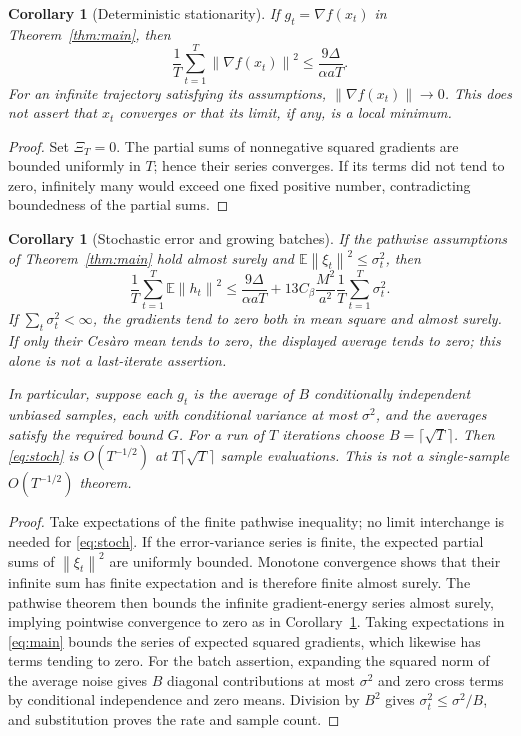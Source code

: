 \documentclass[11pt]{article}
\newtheorem{corollary}[theorem]{Corollary}
\theoremstyle{definition}
\theoremstyle{remark}
\newcommand{\E}{\mathbb E}
\newcommand{\norm}[1]{\left\lVert#1\right\rVert}
\begin{document}
\begin{corollary}[Deterministic stationarity]\label{cor:det}
If $g_t=\nabla f(x_t)$ in Theorem~\ref{thm:main}, then
\[
 \frac1T\sum_{t=1}^T\norm{\nabla f(x_t)}^2\le\frac{9\Delta}{\alpha aT}.
\]
For an infinite trajectory satisfying its assumptions, $\norm{\nabla f(x_t)}\to0$.
This does not assert that $x_t$ converges or that its limit, if any, is a
local minimum.
\end{corollary}
\begin{proof}
Set $\Xi_T=0$. The partial sums of nonnegative squared gradients are bounded
uniformly in $T$; hence their series converges. If its terms did not tend to
zero, infinitely many would exceed one fixed positive number, contradicting
boundedness of the partial sums.
\end{proof}

\begin{corollary}[Stochastic error and growing batches]\label{cor:noise}
If the pathwise assumptions of Theorem~\ref{thm:main} hold almost surely and
$\E\norm{\xi_t}^2\le\sigma_t^2$, then
\begin{equation}\label{eq:stoch}
 \frac1T\sum_{t=1}^T\E\norm{h_t}^2
 \le\frac{9\Delta}{\alpha aT}
 +13C_\beta\frac{M^2}{a^2}\frac1T\sum_{t=1}^T\sigma_t^2.
\end{equation}
If $\sum_t\sigma_t^2<\infty$, the gradients tend to zero both in mean square
and almost surely. If only their Ces\`aro mean tends to zero, the displayed
average tends to zero; this alone is not a last-iterate assertion.

In particular, suppose each $g_t$ is the average of $B$ conditionally
independent unbiased samples, each with conditional variance at most
$\sigma^2$, and the averages satisfy the required bound $G$. For a run of
$T$ iterations choose $B=\lceil\sqrt T\rceil$. Then \eqref{eq:stoch} is
$O(T^{-1/2})$ at $T\lceil\sqrt T\rceil$ sample evaluations. This is not a
single-sample $O(T^{-1/2})$ theorem.
\end{corollary}
\begin{proof}
Take expectations of the finite pathwise inequality; no limit interchange is
needed for \eqref{eq:stoch}. If the error-variance series is finite, the expected
partial sums of $\norm{\xi_t}^2$ are uniformly bounded. Monotone convergence
shows that their infinite sum has finite expectation and is therefore finite
almost surely. The pathwise theorem then bounds the infinite gradient-energy
series almost surely, implying pointwise convergence to zero as in
Corollary~\ref{cor:det}. Taking expectations in \eqref{eq:main} bounds the
series of expected squared gradients, which likewise has terms tending to
zero. For the batch assertion, expanding the squared norm of the average
noise gives $B$ diagonal contributions at most $\sigma^2$ and zero cross
terms by conditional independence and zero means. Division by $B^2$ gives
$\sigma_t^2\le\sigma^2/B$, and substitution proves the rate and sample count.
\end{proof}
\end{document}
